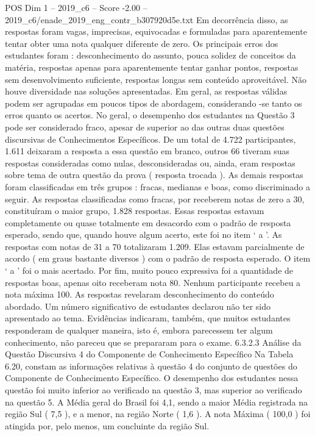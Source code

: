 \begin{textsample}{POS Dim 1 – 2019\_c6 – Score -2.00 – 2019\_c6/enade\_2019\_eng\_contr\_b307920d5e.txt}
Em decorrência disso, as respostas foram vagas, imprecisas, equivocadas e formuladas para aparentemente tentar obter uma nota qualquer diferente de zero.
Os principais erros dos estudantes foram : desconhecimento do assunto, pouca solidez de conceitos da matéria, respostas apenas para aparentemente tentar ganhar pontos, respostas sem desenvolvimento suficiente, respostas longas sem conteúdo aproveitável.
Não houve diversidade nas soluções apresentadas.
Em geral, as respostas válidas podem ser agrupadas em poucos tipos de abordagem, considerando -se tanto os erros quanto os acertos.
No geral, o desempenho dos estudantes na Questão 3 pode ser considerado fraco, apesar de superior ao das outras duas questões discursivas de Conhecimentos Específicos.
De um total de 4.722 participantes, 1.611 deixaram a resposta a essa questão em branco, outros 66 tiveram suas respostas consideradas como nulas, desconsideradas ou, ainda, eram respostas sobre tema de outra questão da prova ( resposta trocada ).
As demais respostas foram classificadas em três grupos : fracas, medianas e boas, como discriminado a seguir.
As respostas classificadas como fracas, por receberem notas de zero a 30, constituíram o maior grupo, 1.828 respostas.
Essas respostas estavam completamente ou quase totalmente em desacordo com o padrão de resposta esperado, sendo que, quando houve algum acerto, este foi no item ‘ a ’.
As respostas com notas de 31 a 70 totalizaram 1.209.
Elas estavam parcialmente de acordo ( em graus bastante diversos ) com o padrão de resposta esperado.
O item ‘ a ’ foi o mais acertado.
Por fim, muito pouco expressiva foi a quantidade de respostas boas, apenas oito receberam nota 80.
Nenhum participante recebeu a nota máxima 100.
As respostas revelaram desconhecimento do conteúdo abordado.
Um número significativo de estudantes declarou não ter sido apresentado ao tema.
Evidências indicaram, também, que muitos estudantes responderam de qualquer maneira, isto é, embora parecessem ter algum conhecimento, não pareceu que se prepararam para o exame. 6.3.2.3 Análise da Questão Discursiva 4 do Componente de Conhecimento Específico Na Tabela 6.20, constam as informações relativas à questão 4 do conjunto de questões do Componente de Conhecimento Específico.
O desempenho dos estudantes nessa questão foi muito inferior ao verificado na questão 3, mas superior ao verificado na questão 5.
A Média geral do Brasil foi 4,1, sendo a maior Média registrada na região Sul ( 7,5 ), e a menor, na região Norte ( 1,6 ).
A nota Máxima ( 100,0 ) foi atingida por, pelo menos, um concluinte da região Sul.

\end{textsample}
